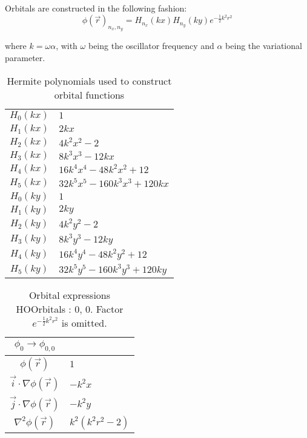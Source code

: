 % 
% 
% 
% 
% 

Orbitals are constructed in the following fashion:
\begin{equation*}
\phi(\vec r)_{n_x, n_y} = H_{n_x}(kx)H_{n_y}(ky)e^{-\frac{1}{2}k^2r^2}
\end{equation*}   

where $k = \omega\alpha$, with $\omega$ being the oscillator frequency and $\alpha$ being the variational parameter.  



\begin{table}
\begin{center}
\begin{tabular}{c|l}
$H_{0}(kx)$ & $1$\\
$H_{1}(kx)$ & $2 k x$\\
$H_{2}(kx)$ & $4 k^{2} x^{2} -2$\\
$H_{3}(kx)$ & $8 k^{3} x^{3} - 12 k x$\\
$H_{4}(kx)$ & $16 k^{4} x^{4} - 48 k^{2} x^{2} + 12$\\
$H_{5}(kx)$ & $32 k^{5} x^{5} - 160 k^{3} x^{3} + 120 k x$\\
\hline
$H_{0}(ky)$ & $1$\\
$H_{1}(ky)$ & $2 k y$\\
$H_{2}(ky)$ & $4 k^{2} y^{2} -2$\\
$H_{3}(ky)$ & $8 k^{3} y^{3} - 12 k y$\\
$H_{4}(ky)$ & $16 k^{4} y^{4} - 48 k^{2} y^{2} + 12$\\
$H_{5}(ky)$ & $32 k^{5} y^{5} - 160 k^{3} y^{3} + 120 k y$\\
\end{tabular}
\caption{Hermite polynomials used to construct orbital functions}
\end{center}
\end{table}

\clearpage

\begin{table}
\begin{center}
\begin{tabular}{c|l}
$\phi_{0} \rightarrow \phi_{0, 0}$\\
\hline
$\phi(\vec r)$ & $1$\\
\hline
$\vec i\cdot \nabla \phi(\vec r)$ & $- k^{2} x$\\
$\vec j\cdot \nabla \phi(\vec r)$ & $- k^{2} y$\\
\hline
$\nabla^2 \phi(\vec r)$ & $k^{2} \left(k^{2} r^{2} -2\right)$\\
\end{tabular}
\caption{Orbital expressions HOOrbitals : 0, 0. Factor $e^{- \frac{1}{2} k^{2} r^{2}}$ is omitted.}
\end{center}
\end{table}


